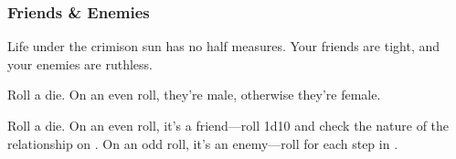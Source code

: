 \subsubsection{Friends \& Enemies}
Life under the crimison sun has no half measures. Your friends are tight, and your enemies are ruthless.

\begin{enumerate*}
\item Roll a die. On an even roll, they're male, otherwise they're female.
\item Roll a die. On an even roll, it's a friend---roll 1d10 and check the nature of the relationship on . On an odd roll, it's an enemy---roll for each step in .
\end{enumerate*}


